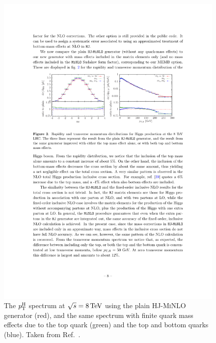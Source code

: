 \begin{figure}[hbtp]
  \begin{center}
    \includegraphics[width=0.6\linewidth]{img/theory/finitequarkmasseffects.pdf}
    \caption{
        The $p_\mathrm{T}^\mathrm{H}$ spectrum at $\sqrt{s}=8\,\text{TeV}$ using the plain \textsc{HJ-MiNLO}~\cite{Hamilton:2015nsa} generator (red), and the same spectrum with finite quark mass effects due to the top quark (green) and the top and bottom quarks (blue).
        Taken from Ref.~\cite{Hamilton:2015nsa}.
        }
    \label{fig:finitequarkmasseffects}
  \end{center}
\end{figure}


